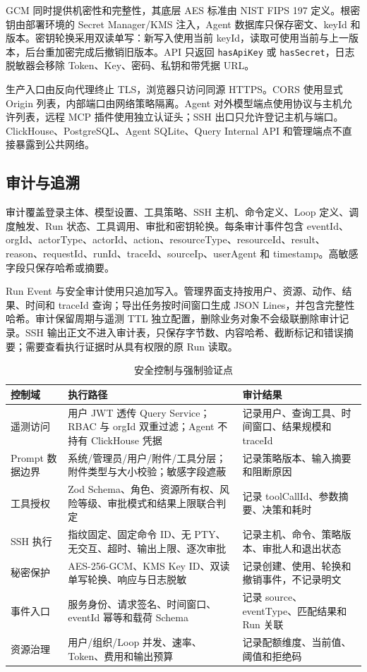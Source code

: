 \documentclass[conference,10pt]{IEEEtran}
\newcommand{\code}[1]{\texttt{#1}}
\begin{document}
GCM 同时提供机密性和完整性，其底层 AES 标准由 NIST FIPS 197 定义\cite{fips197}。根密钥由部署环境的 Secret Manager/KMS 注入，Agent 数据库只保存密文、keyId 和版本。密钥轮换采用双读单写：新写入使用当前 keyId，读取可使用当前与上一版本，后台重加密完成后撤销旧版本。API 只返回 \code{hasApiKey} 或 \code{hasSecret}，日志脱敏器会移除 Token、Key、密码、私钥和带凭据 URL。

生产入口由反向代理终止 TLS，浏览器只访问同源 HTTPS。CORS 使用显式 Origin 列表，内部端口由网络策略隔离。Agent 对外模型端点使用协议与主机允许列表，远程 MCP 插件使用独立认证头；SSH 出口只允许登记主机与端口。ClickHouse、PostgreSQL、Agent SQLite、Query Internal API 和管理端点不直接暴露到公共网络。

\subsection{审计与追溯}

审计覆盖登录主体、模型设置、工具策略、SSH 主机、命令定义、Loop 定义、调度触发、Run 状态、工具调用、审批和密钥轮换。每条审计事件包含 eventId、orgId、actorType、actorId、action、resourceType、resourceId、result、reason、requestId、runId、traceId、sourceIp、userAgent 和 timestamp。高敏感字段只保存哈希或摘要。

Run Event 与安全审计使用只追加写入。管理界面支持按用户、资源、动作、结果、时间和 traceId 查询；导出任务按时间窗口生成 JSON Lines，并包含完整性哈希。审计保留周期与遥测 TTL 独立配置，删除业务对象不会级联删除审计记录。SSH 输出正文不进入审计表，只保存字节数、内容哈希、截断标记和错误摘要；需要查看执行证据时从具有权限的原 Run 读取。

\begin{table}[t]
\caption{安全控制与强制验证点}
\label{tab:security-controls}
\centering
\small
\begin{tabularx}{\textwidth}{p{2.3cm}Y Y}
\toprule
\textbf{控制域} & \textbf{执行路径} & \textbf{审计结果} \\
\midrule
遥测访问 & 用户 JWT 透传 Query Service；RBAC 与 orgId 双重过滤；Agent 不持有 ClickHouse 凭据 & 记录用户、查询工具、时间窗口、结果规模和 traceId \\
Prompt 数据边界 & 系统/管理员/用户/附件/工具分层；附件类型与大小校验；敏感字段遮蔽 & 记录策略版本、输入摘要和阻断原因 \\
工具授权 & Zod Schema、角色、资源所有权、风险等级、审批模式和结果上限联合判定 & 记录 toolCallId、参数摘要、决策和耗时 \\
SSH 执行 & 指纹固定、固定命令 ID、无 PTY、无交互、超时、输出上限、逐次审批 & 记录主机、命令、策略版本、审批人和退出状态 \\
秘密保护 & AES-256-GCM、KMS Key ID、双读单写轮换、响应与日志脱敏 & 记录创建、使用、轮换和撤销事件，不记录明文 \\
事件入口 & 服务身份、请求签名、时间窗口、eventId 幂等和载荷 Schema & 记录 source、eventType、匹配结果和 Run 关联 \\
资源治理 & 用户/组织/Loop 并发、速率、Token、费用和输出预算 & 记录配额维度、当前值、阈值和拒绝码 \\
\bottomrule
\end{tabularx}
\end{table}
\end{document}
